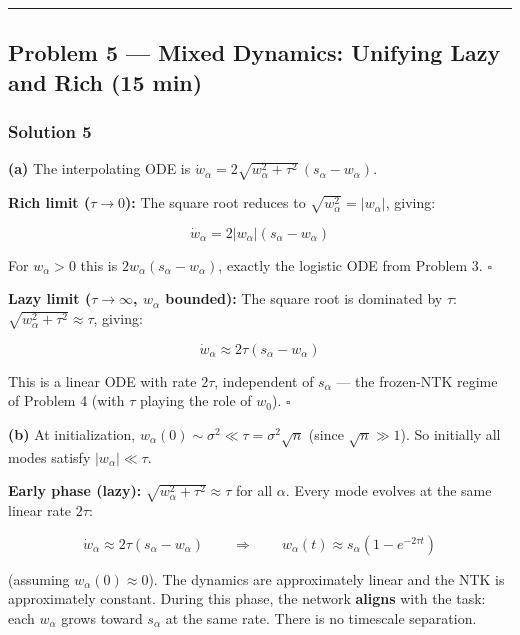 \documentclass[
]{article}
\begin{document}
\begin{center}\rule{0.5\linewidth}{0.5pt}\end{center}

\subsection{Problem 5 --- Mixed Dynamics: Unifying Lazy and Rich (15
min)}\label{problem-5-mixed-dynamics-unifying-lazy-and-rich-15-min}

\subsubsection{Solution 5}\label{solution-5}

\textbf{(a)} The interpolating ODE is
\(\dot{w}_\alpha = 2\sqrt{w_\alpha^2 + \tau^2}\,(s_\alpha - w_\alpha)\).

\textbf{Rich limit (\(\tau \to 0\)):} The square root reduces to
\(\sqrt{w_\alpha^2} = |w_\alpha|\), giving:

\[\dot{w}_\alpha = 2|w_\alpha|(s_\alpha - w_\alpha)\]

For \(w_\alpha > 0\) this is \(2w_\alpha(s_\alpha - w_\alpha)\), exactly
the logistic ODE from Problem 3. \(\square\)

\textbf{Lazy limit (\(\tau \to \infty\), \(w_\alpha\) bounded):} The
square root is dominated by \(\tau\):
\(\sqrt{w_\alpha^2 + \tau^2} \approx \tau\), giving:

\[\dot{w}_\alpha \approx 2\tau(s_\alpha - w_\alpha)\]

This is a linear ODE with rate \(2\tau\), independent of \(s_\alpha\)
--- the frozen-NTK regime of Problem 4 (with \(\tau\) playing the role
of \(w_0\)). \(\square\)

\textbf{(b)} At initialization,
\(w_\alpha(0) \sim \sigma^2 \ll \tau = \sigma^2\sqrt{n}\) (since
\(\sqrt{n} \gg 1\)). So initially all modes satisfy
\(|w_\alpha| \ll \tau\).

\textbf{Early phase (lazy):} \(\sqrt{w_\alpha^2 + \tau^2} \approx \tau\)
for all \(\alpha\). Every mode evolves at the same linear rate
\(2\tau\):

\[\dot{w}_\alpha \approx 2\tau(s_\alpha - w_\alpha) \qquad \Longrightarrow \qquad w_\alpha(t) \approx s_\alpha(1 - e^{-2\tau t})\]

(assuming \(w_\alpha(0) \approx 0\)). The dynamics are approximately
linear and the NTK is approximately constant. During this phase, the
network \textbf{aligns} with the task: each \(w_\alpha\) grows toward
\(s_\alpha\) at the same rate. There is no timescale separation.
\end{document}
